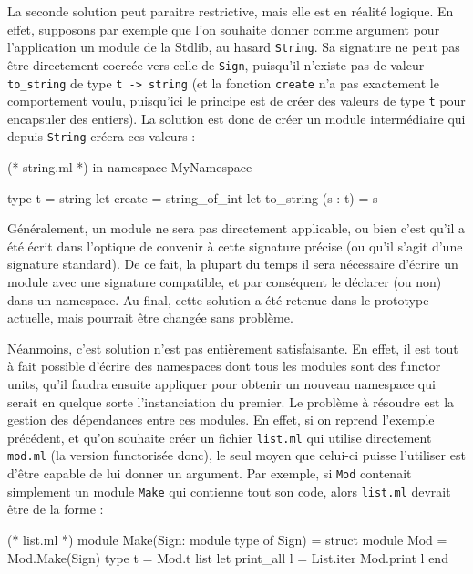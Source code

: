 \documentclass[11pt,a4paper]{report}
\begin{document}
La seconde solution peut paraitre restrictive, mais elle est en réalité
logique. En effet, supposons par exemple que l'on souhaite donner comme argument
pour l'application un module de la Stdlib, au hasard \texttt{String}. Sa
signature ne peut pas être directement coercée vers celle de \texttt{Sign},
puisqu'il n'existe pas de valeur \lstinline{to_string} de type 
\lstinline{t -> string} (et la fonction \lstinline{create} n'a pas exactement le
comportement voulu, puisqu'ici le principe est de créer des valeurs de type
\texttt{t} pour encapsuler des entiers). La solution est donc de créer un module
intermédiaire qui depuis \texttt{String} créera ces valeurs :
\begin{OCaml}
(* string.ml *)
in namespace MyNamespace

type t = string
let create = string_of_int
let to_string (s : t) = s
\end{OCaml}

Généralement, un module ne sera pas directement applicable, ou bien c'est qu'il
a été écrit dans l'optique de convenir à cette signature précise (ou qu'il
s'agit d'une signature standard). De ce fait, la plupart du temps il sera
nécessaire d'écrire un module avec une signature compatible, et par conséquent
le déclarer (ou non) dans un namespace. Au final, cette solution a été retenue
dans le prototype actuelle, mais pourrait être changée sans problème.

\medskip

Néanmoins, c'est solution n'est pas entièrement satisfaisante. En effet, il est
tout à fait possible d'écrire des namespaces dont tous les modules sont des
functor units, qu'il faudra ensuite appliquer pour obtenir un nouveau namespace
qui serait en quelque sorte l'instanciation du premier. Le problème à résoudre
est la gestion des dépendances entre ces modules. En effet, si on reprend
l'exemple précédent, et qu'on souhaite créer un fichier \texttt{list.ml} qui
utilise directement \texttt{mod.ml} (la version functorisée donc), le seul moyen
que celui-ci puisse l'utiliser est d'être capable de lui donner un argument. Par
exemple, si \texttt{Mod} contenait simplement un module \texttt{Make} qui
contienne tout son code, alors \texttt{list.ml} devrait être de la forme :
\begin{OCaml}
(* list.ml *)
module Make(Sign: module type of Sign) =
  struct
    module Mod = Mod.Make(Sign)
    type t = Mod.t list
    let print_all l = List.iter Mod.print l
  end
\end{OCaml}
\end{document}
